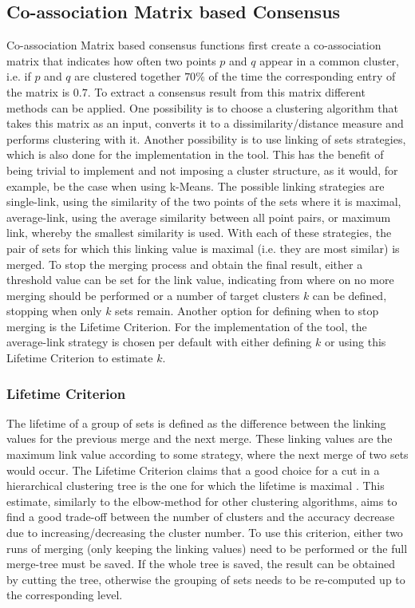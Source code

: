 \documentclass[
	a4paper,
	english,
	twoside,
	openright,               
	11pt                            
	]{report}
\begin{document}
\subsection{Co-association Matrix based Consensus}
Co-association Matrix based consensus functions \cite{Monti2003} first create a co-association matrix that indicates how often two points $p$ and $q$ appear in a common cluster, i.e. if $p$ and $q$ are clustered together $70\%$ of the time the corresponding entry of the matrix is $0.7$. To extract a consensus result from this matrix different methods can be applied. One possibility is to choose a clustering algorithm that takes this matrix as an input, converts it to a dissimilarity/distance measure and performs clustering with it. Another possibility is to use linking of sets strategies, which is also done for the implementation in the tool. This has the benefit of being trivial to implement and not imposing a cluster structure, as it would, for example, be the case when using k-Means. The possible linking strategies are single-link, using the similarity of the two points of the sets where it is maximal, average-link, using the average similarity between all point pairs, or maximum link, whereby the smallest similarity is used. With each of these strategies, the pair of sets for which this linking value is maximal (i.e. they are most similar) is merged. To stop the merging process and obtain the final result, either a threshold value can be set for the link value, indicating from where on no more merging should be performed or a number of target clusters $k$ can be defined, stopping when only $k$ sets remain. Another option for defining when to stop merging is the Lifetime Criterion. For the implementation of the tool, the average-link strategy is chosen per default with either defining $k$ or using this Lifetime Criterion to estimate $k$.

\subsubsection{Lifetime Criterion}
The lifetime of a group of sets is defined as the difference between the linking values for the previous merge and the next merge. These linking values are the maximum link value according to some strategy, where the next merge of two sets would occur. The Lifetime Criterion claims that a good choice for a cut in a hierarchical clustering tree is the one for which the lifetime is maximal \cite{YANG201735}. This estimate, similarly to the elbow-method for other clustering algorithms, aims to find a good trade-off between the number of clusters and the accuracy decrease due to increasing/decreasing the cluster number. To use this criterion, either two runs of merging (only keeping the linking values) need to be performed or the full merge-tree must be saved. If the whole tree is saved, the result can be obtained by cutting the tree, otherwise the grouping of sets needs to be re-computed up to the corresponding level.
\end{document}
